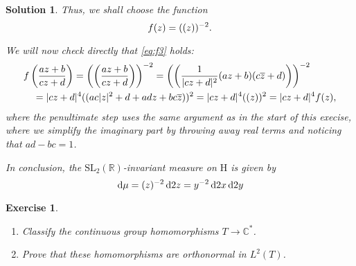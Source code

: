 \documentclass{article}
\newtheorem{ex}{Exercise}
\theoremstyle{nonumberplain}
\newtheorem{sol}{Solution}
\newcommand{\R}{\mathbb{R}}
\newcommand{\C}{\mathbb{C}}
\newcommand{\conj}[1]{\overline{#1}}
\newcommand{\SL}{\mathrm{SL}}
\newcommand{\Hp}{\mathrm{H}}
\let\Im\relax
\DeclareMathOperator{\Im}{Im}
\DeclarePairedDelimiter{\abs}{\lvert}{\rvert}
\begin{document}
\begin{sol}
Thus, we shall choose the function
\begin{equation}
f(z) = (\Im(z))^{-2}.
\end{equation}

We will now check directly that \eqref{eq:f3} holds:
\begin{equation}
\begin{multlined}
f\left(\frac{az+b}{cz+d}\right) = \left(\Im\left(\frac{az+b}{cz+d}\right)\right)^{-2} = \left(\Im\left(\frac1{\abs{c z + d}^2} (az+b)(c \conj z + d) \right)\right)^{-2} \\ = \abs{c z + d}^4 (\Im(ac \abs{z}^2 + d + adz + bc \conj z))^2 = \abs{c z + d}^4 (\Im(z))^2 = \abs{c z + d}^4 f(z),
\end{multlined}
\end{equation}
where the penultimate step uses the same argument as in the start of this execise, where we simplify the imaginary part by throwing away real terms and noticing that $ad-bc = 1$.

In conclusion, the $\SL_2(\R)$-invariant measure on $\Hp$ is given by
\begin{equation}
\dl \mu = (\Im z)^{-2} \dl2 z = y^{-2} \dl2 x \dl2 y
\end{equation}
\end{sol}

\begin{ex}\leavevmode
\begin{enumerate}
\item Classify the continuous group homomorphisms $T \to \C^*$.
\item Prove that these homomorphisms are orthonormal in $L^2(T)$.
\end{enumerate}
\end{ex}
\end{document}
